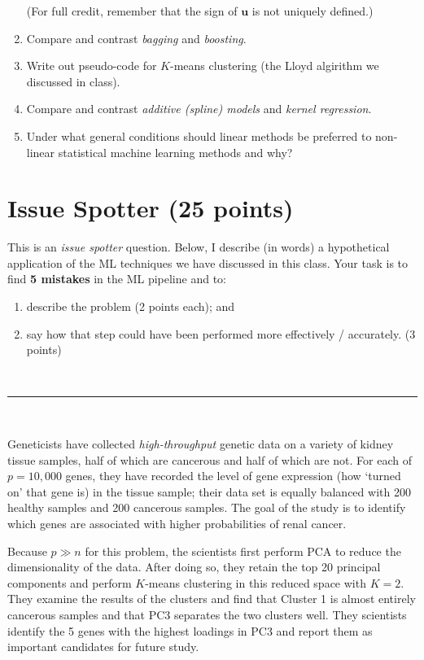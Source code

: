\documentclass[12pt]{article}
\newcommand{\bu}{\bm{u}}
\begin{document}
\begin{enumerate}[label={SA\arabic*.}]
(For full credit, remember that the sign of $\bu$ is not uniquely defined.)
\item Compare and contrast \emph{bagging} and \emph{boosting}. ~ \\ \vspace{2in}
\item Write out pseudo-code for $K$-means clustering (the Lloyd algirithm we discussed in class). ~ \\ \vspace{2in}
\item Compare and contrast \emph{additive (spline) models} and \emph{kernel regression}. ~ \\ \vspace{2in}
\item Under what general conditions should linear methods be preferred to non-linear statistical machine learning methods and why?
\end{enumerate}

\clearpage

\section*{Issue Spotter (25 points)}

This is an \emph{issue spotter} question. Below, I describe (in words) a hypothetical application of the ML techniques we have discussed in this class. Your task is to find \textbf{5 mistakes} in the ML pipeline and to:
\begin{enumerate}[label={\roman*)}]
\item describe the problem (2 points each); and 
\item say how that step could have been performed more effectively / accurately. (3 points)
\end{enumerate}
~
\hrule 
~

Geneticists have collected \emph{high-throughput} genetic data on a variety of kidney tissue 
    samples, half of which are cancerous and half of which are not. For each of $p = 10,000$ genes, 
    they have recorded the level of gene expression (how `turned on' that gene is) in the tissue sample; 
    their data set is equally balanced with 200 healthy samples and 200 cancerous samples. The goal of the
    study is to identify which genes are associated with higher probabilities of renal cancer. 

    Because $p \gg n$ for this problem, the scientists first perform PCA to reduce the dimensionality of the data. 
    After doing so, they retain the top 20 principal components and perform $K$-means clustering in this reduced space with $K = 2$.
    They examine the results of the clusters and find that Cluster 1 is almost entirely cancerous samples and that 
    PC3 separates the two clusters well. They scientists identify the 5 genes with the highest loadings in PC3 and report 
    them as important candidates for future study. 
\end{document}

